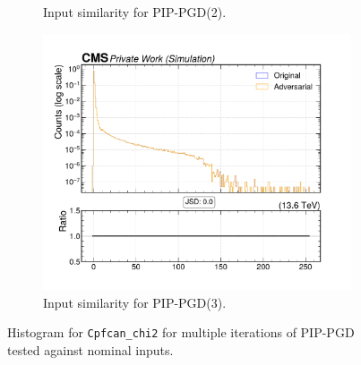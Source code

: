 \begin{figure}[htbp]
\begin{subfigure}[t]{0.32\textwidth}
    \caption*{Input similarity for PIP-PGD(2).}
  \end{subfigure}\hfill
  \begin{subfigure}[t]{0.32\textwidth}
    \includegraphics[width=\linewidth]{media/output/features/compare/combined_it_3/cmp_cpf_arr_Cpfcan_chi2.pdf}
    \caption*{Input similarity for PIP-PGD(3).}
  \end{subfigure}

  \caption*{Histogram for \texttt{Cpfcan\_chi2} for multiple iterations of PIP-PGD tested against nominal inputs.}
  \label{fig:combined_input_Cpfcan_chi2}
\end{figure}

